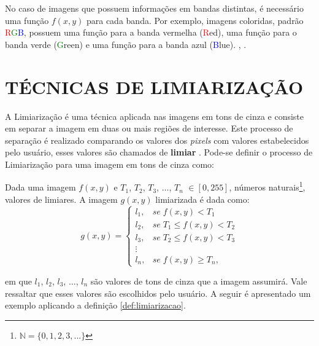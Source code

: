 No caso de imagens que possuem informações em bandas distintas, é necessário uma função $f(x,y)$ para cada banda. Por exemplo, imagens coloridas, padrão \textcolor{red}{R}\textcolor{green}{G}\textcolor{blue}{B}, possuem uma função para a banda vermelha (\textcolor{red}{R}ed), uma função para o banda verde (\textcolor{green}{G}reen) e uma função para a banda azul (\textcolor{blue}{B}lue). \cite{gonzalezprocessamento}, \cite{pddii}.

\section{TÉCNICAS DE LIMIARIZAÇÃO}

A Limiarização é uma técnica aplicada nas imagens em tons de cinza e consiste em separar a imagem em duas ou mais regiões de interesse. Este processo de separação é realizado comparando os valores dos \textit{pixels} com valores estabelecidos pelo usuário, esses valores são chamados de \textbf{limiar} \cite{gonzalezprocessamento, pedrinischwartz}. Pode-se definir o processo de Limiarização para uma imagem em tons de cinza como:

\begin{define}
	Dada uma imagem $f(x,y)$ e $T_1$, $T_2$, $T_3$, $\dots$, $T_n$ $\in [0,255]$, números naturais\footnote{$\mathbb{N} = \{0,1,2,3,...\}$}, valores de limiares. A imagem $g(x,y)$ limiarizada é dada como:
	\begin{equation}
		g(x,y) =
		\begin{cases}
			l_1, & se \; f(x,y) < T_1 \\
			l_2, & se \; T_1 \leq f(x,y) < T_2 \\
			l_3, & se \; T_2 \leq f(x,y) < T_3 \\
			\vdots \\
			l_n, & se \; f(x,y) \geq T_n,
		\end{cases}
		\label{eq:limiarizacao}
	\end{equation}
	\label{def:limiarizacao}
\end{define}

\noindent em que $l_1$, $l_2$, $l_3$, $\dots$, $l_n$ são valores de tons de cinza que a imagem assumirá. Vale ressaltar que esses valores são escolhidos pelo usuário. A seguir é apresentado um exemplo aplicando a definição \ref{def:limiarizacao}.


